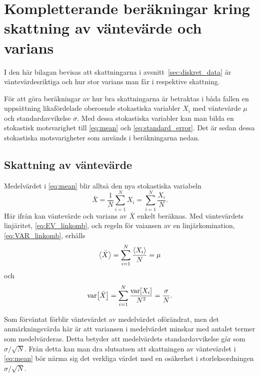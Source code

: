 \chapter{Kompletterande beräkningar kring skattning av väntevärde och varians}
\label{sec:noggrannhet}

I den här bilagan bevisas att skattningarna i avsnitt~\ref{sec:diskret_data} är väntevärdesriktiga och hur stor varians man får i respektive skattning.

För att göra beräkningar av hur bra skattningarna är betraktas i båda fallen en uppsättning likafördelade oberoende stokastiska variabler $X_i$ med väntevärde $\mu$ och standardavvikelse $\sigma$. Med dessa stokastiska variabler kan man bilda en stokastisk motsvarighet\footnotemark{} till \eqref{eq:mean} och \eqref{eq:standard_error}. Det är sedan dessa stokastiska motsvarigheter som används i beräkningarna nedan. 



\section{Skattning av väntevärde}
Medelvärdet i \eqref{eq:mean} blir alltså den nya stokastiska variabeln
\begin{equation}
\bar{X} = \frac{1}{N} \sum_{i=1}^N X_i = \sum_{i=1}^N \frac{X_i}{N}.
\end{equation}
Här ifrån kan väntevärde och varians av $\bar{X}$ enkelt beräknas. Med väntevärdets linjäritet, \eqref{eq:EV_linkomb}, och regeln för vaiansen av en linjärkomination, \eqref{eq:VAR_linkomb}, erhålls
\begin{equation}
\ev{\bar{X}} = \sum_{i=1}^N \frac{\ev{X_i}}{N} = \mu
\end{equation}
och
\begin{equation}
\text{var}\!\left[\bar{X}\right] = \sum_{i=1}^N \frac{\text{var}\!\left[X_i\right]}{N^2} = \frac{\sigma}{N}.
\end{equation}

Som förväntat förblir väntevärdet av medelvärdet oförändrat, men det anmärkningsvärda här är att variansen i medelvärdet minskar med antalet termer som medelvärderas. Detta betyder att medelvärdets standardavvikelse går som $\sigma/\sqrt{N}$.
Från detta kan man dra slutsatsen att skattningen av väntevärdet i \eqref{eq:mean} bör närma sig det verkliga värdet med en osäkerhet i storleksordningen $\sigma/\sqrt{N}$. 

